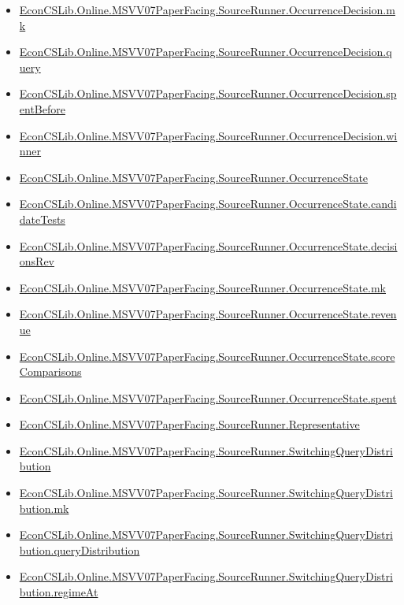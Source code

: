 \documentclass[10pt]{article}
\begin{document}
\begin{itemize}[leftmargin=1.2em]
\begin{itemize}[leftmargin=1.2em]
\item \hyperlink{library-prerequisite-2f11cd10447286da}{EconCSLib.Online.MSVV07PaperFacing.SourceRunner.OccurrenceDecision.mk}
\item \hyperlink{library-prerequisite-75637cf2539964d5}{EconCSLib.Online.MSVV07PaperFacing.SourceRunner.OccurrenceDecision.query}
\item \hyperlink{library-prerequisite-2363e45b3074bd7a}{EconCSLib.Online.MSVV07PaperFacing.SourceRunner.OccurrenceDecision.spentBefore}
\item \hyperlink{library-prerequisite-a9e8738cbca7076e}{EconCSLib.Online.MSVV07PaperFacing.SourceRunner.OccurrenceDecision.winner}
\item \hyperlink{library-prerequisite-5537459c62884d43}{EconCSLib.Online.MSVV07PaperFacing.SourceRunner.OccurrenceState}
\item \hyperlink{library-prerequisite-d583661f66e416f5}{EconCSLib.Online.MSVV07PaperFacing.SourceRunner.OccurrenceState.candidateTests}
\item \hyperlink{library-prerequisite-e22fccc324a141b5}{EconCSLib.Online.MSVV07PaperFacing.SourceRunner.OccurrenceState.decisionsRev}
\item \hyperlink{library-prerequisite-9ea558188c249a22}{EconCSLib.Online.MSVV07PaperFacing.SourceRunner.OccurrenceState.mk}
\item \hyperlink{library-prerequisite-d30d6490f0232da3}{EconCSLib.Online.MSVV07PaperFacing.SourceRunner.OccurrenceState.revenue}
\item \hyperlink{library-prerequisite-c4394b30d2fa80bb}{EconCSLib.Online.MSVV07PaperFacing.SourceRunner.OccurrenceState.scoreComparisons}
\item \hyperlink{library-prerequisite-ede407543d4af956}{EconCSLib.Online.MSVV07PaperFacing.SourceRunner.OccurrenceState.spent}
\item \hyperlink{library-prerequisite-15694563526e4528}{EconCSLib.Online.MSVV07PaperFacing.SourceRunner.Representative}
\item \hyperlink{library-prerequisite-c4c394586c6aae5c}{EconCSLib.Online.MSVV07PaperFacing.SourceRunner.SwitchingQueryDistribution}
\item \hyperlink{library-prerequisite-d056a2d3485c0751}{EconCSLib.Online.MSVV07PaperFacing.SourceRunner.SwitchingQueryDistribution.mk}
\item \hyperlink{library-prerequisite-91c9e2bc0ccda84b}{EconCSLib.Online.MSVV07PaperFacing.SourceRunner.SwitchingQueryDistribution.queryDistribution}
\item \hyperlink{library-prerequisite-997d687e8dd6403b}{EconCSLib.Online.MSVV07PaperFacing.SourceRunner.SwitchingQueryDistribution.regimeAt}

\end{itemize}
\end{itemize}
\end{document}
